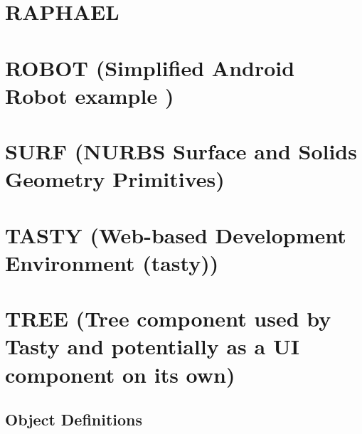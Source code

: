 \documentclass [11pt]{book}
\begin{document}
\section{RAPHAEL }

\label{sec:raphael}







\section{ROBOT (Simplified Android Robot example )}

\label{sec:robot(simplifiedandroidrobotexample)}







\section{SURF (NURBS Surface and Solids Geometry Primitives)}

\label{sec:surf(nurbssurfaceandsolidsgeometryprimitives)}







\section{TASTY (Web-based Development Environment (tasty))}

\label{sec:tasty(web-baseddevelopmentenvironment(tasty))}







\section{TREE (Tree component used by Tasty and potentially as a UI component on its own)}

\label{sec:tree(treecomponentusedbytastyandpotentiallyasauicomponentonitsown)}





\subsection{Object Definitions}

\label{subsec:objectdefinitions}
\end{document}

